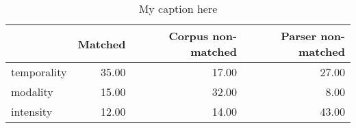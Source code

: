 \begin{table}[!ht]
\centering
\begin{tabular}{lrrr}
\toprule
{} &  Matched &  Corpus non-matched &  Parser non-matched \\
\midrule
temporality &    35.00 &               17.00 &               27.00 \\
modality    &    15.00 &               32.00 &                8.00 \\
intensity   &    12.00 &               14.00 &               43.00 \\
\bottomrule
\end{tabular}
\caption{My caption here}
\label{tab:MOOD_ASSESMENT-ocd-data}
\end{table}